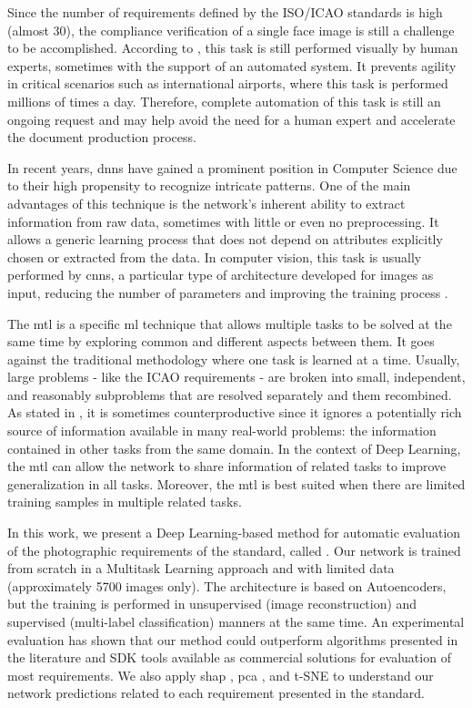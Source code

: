 Since the number of requirements defined by the ISO/ICAO standards is high (almost 30), the compliance verification of a single face image is still a challenge to be accomplished. According to \cite{ferrara2012multi}, this task is still performed visually by human experts, sometimes with the support of an automated system. It prevents agility in critical scenarios such as international airports, where this task is performed millions of times a day. Therefore, complete automation of this task is still an ongoing request and may help avoid the need for a human expert and accelerate the document production process.

In recent years, \acfp{dnn} have gained a prominent position in Computer Science due to their high propensity to recognize intricate patterns. One of the main advantages of this technique is the network's inherent ability to extract information from raw data, sometimes with little or even no preprocessing. It allows a generic learning process that does not depend on attributes explicitly chosen or extracted from the data. In computer vision, this task is usually performed by \acfp{cnn}, a particular type of architecture developed for images as input, reducing the number of parameters and improving the training process \citep{goodfellow2016deep}.

The \acf{mtl} is a specific \acl{ml} technique that allows multiple tasks to be solved at the same time by exploring common and different aspects between them. It goes against the traditional methodology where one task is learned at a time. Usually, large problems - like the ICAO requirements - are broken into small, independent, and reasonably subproblems that are resolved separately and them recombined. As stated in \cite{Caruana1997}, it is sometimes counterproductive since it ignores a potentially rich source of information available in many real-world problems: the information contained in other tasks from the same domain. In the context of Deep Learning, the \acs{mtl} can allow the network to share information of related tasks to improve generalization in all tasks. Moreover, the \acl{mtl} is best suited when there are limited training samples in multiple related tasks.

In this work, we present a Deep Learning-based method for automatic evaluation of the photographic requirements of the \icao standard, called \methodname. Our network is trained from scratch in a Multitask Learning approach and with limited data (approximately 5700 images only). The architecture is based on Autoencoders, but the training is performed in unsupervised (image reconstruction) and supervised (multi-label classification) manners at the same time. An experimental evaluation has shown that our method could outperform algorithms presented in the literature and SDK tools available as commercial solutions for evaluation of most requirements. We also apply \acf{shap} \citep{shap2018}, \acf{pca} \citep{pca}, and t-SNE \citep{tsne} to understand our network predictions related to each requirement presented in the \icao standard.

